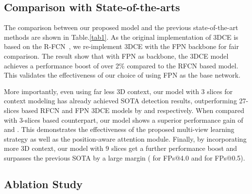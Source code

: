 \documentclass[runningheads]{llncs}
\begin{document}
\subsection{Comparison with State-of-the-arts}

The comparison between our proposed model and the previous state-of-the-art methods are shown in Table.\ref{tab1}. As the original implementation of 3DCE is based on the R-FCN~\cite{RFCN}, we re-implement 3DCE with the FPN backbone for fair comparison.
The result show that with FPN as backbone, the 3DCE model achieves a performance boost of over 2\% compared to the RFCN based model. This validates the effectiveness of our choice of using FPN as the base network. 

More importantly, even using far less 3D context, our model with 3 slices for context modeling has already achieved SOTA detection results, outperforming 27-slices based RFCN and FPN 3DCE models by  and  respectively. When compared with 3-slices based counterpart, our model shows a superior performance gain of  and . This demonstrates the effectiveness of the proposed multi-view learning strategy as well as the position-aware attention module. Finally, by incorporating more 3D context, our model with 9 slices get a further performance boost and surpasses the previous SOTA by a large margin ( for FPs@4.0 and  for FPs@0.5). 





\subsection{Ablation Study}
\end{document}
